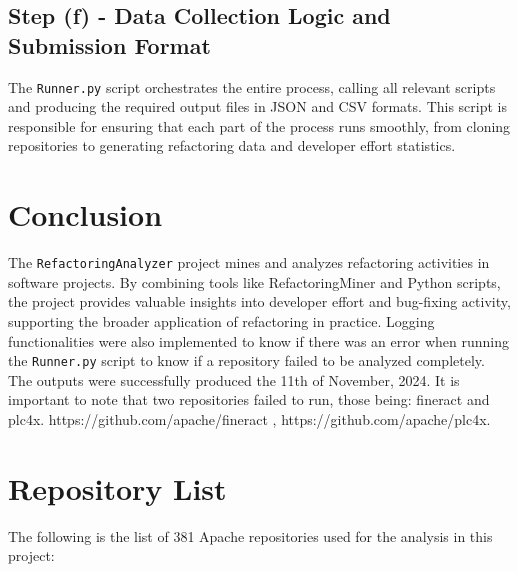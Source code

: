 \documentclass[sigconf]{acmart}
\begin{document}
\subsection{Step (f) - Data Collection Logic and Submission Format}
The \texttt{Runner.py} script orchestrates the entire process, calling all relevant scripts and producing the required output files in JSON and CSV formats. This script is responsible for ensuring that each part of the process runs smoothly, from cloning repositories to generating refactoring data and developer effort statistics.

\section{Conclusion}
The \texttt{RefactoringAnalyzer} project mines and analyzes refactoring activities in software projects. By combining tools like RefactoringMiner and Python scripts, the project provides valuable insights into developer effort and bug-fixing activity, supporting the broader application of refactoring in practice. Logging functionalities were also implemented to know if there was an error when running the \texttt{Runner.py} script to know if a repository failed to be analyzed completely.
The outputs were successfully produced the 11th of November, 2024. It is important to note that two repositories failed to run, those being: fineract and plc4x. https://github.com/apache/fineract , https://github.com/apache/plc4x.



\newpage
\appendix
\section{Repository List}
The following is the list of 381 Apache repositories used for the analysis in this project:
\end{document}
